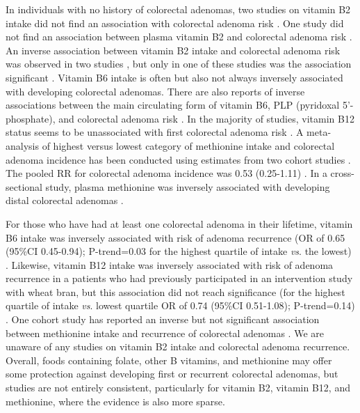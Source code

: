 \noindent In individuals with no history of colorectal adenomas, two studies on vitamin B2 intake did not find an association with colorectal adenoma risk \cite{c153,c154}. One study did not find an association between plasma vitamin B2 and colorectal adenoma risk \cite{c155}. An inverse association between vitamin B2 intake and colorectal adenoma risk was observed in two studies \cite{c156,c157}, but only in one of these studies was the association significant \cite{c156}. Vitamin B6 intake is often \cite{c147,c153} but also not always \cite{c156} inversely associated with developing colorectal adenomas. There are also reports of inverse associations between the main circulating form of vitamin B6, PLP (pyridoxal 5'-phosphate), and colorectal adenoma risk \cite{c155,c158}. In the majority of studies, vitamin B12 status seems to be unassociated with first colorectal adenoma risk \cite{c155,c156,c158}. A meta-analysis of highest versus lowest category of methionine intake and colorectal adenoma incidence has been conducted using estimates from two cohort studies \cite{c146}. The pooled RR for colorectal adenoma incidence was 0.53 (0.25-1.11) \cite{c146}. In a cross-sectional study, plasma methionine was inversely associated with developing distal colorectal adenomas \cite{c155}. 
 
\noindent For those who have had at least one colorectal adenoma in their lifetime, vitamin B6 intake was inversely associated with risk of adenoma recurrence (OR of 0.65 (95\%CI 0.45-0.94); P-trend=0.03 for the highest quartile of intake \textit{vs}. the lowest) \cite{c147}. Likewise, vitamin B12 intake was inversely associated with risk of adenoma recurrence in a patients who had previously participated in an intervention study with wheat bran, but this association did not reach significance (for the highest quartile of intake \textit{vs}. lowest quartile OR of 0.74 (95\%CI 0.51-1.08); P-trend=0.14) \cite{c147}. One cohort study has reported an inverse but not significant association between methionine intake and recurrence of colorectal adenomas \cite{c147}. We are unaware of any studies on vitamin B2 intake and colorectal adenoma recurrence. Overall, foods containing folate, other B vitamins, and methionine may offer some protection against developing first or recurrent colorectal adenomas, but studies are not entirely consistent, particularly for vitamin B2, vitamin B12, and methionine, where the evidence is also more sparse. 
 
